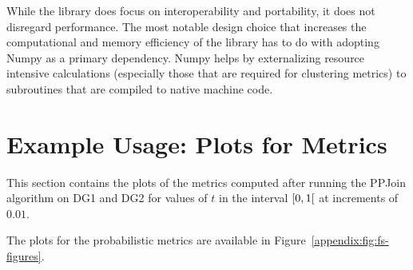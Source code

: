 \documentclass{article}
\begin{document}
    While the library does focus on interoperability and portability, it does
    not disregard performance.
    The most notable design choice that increases the computational and memory
    efficiency of the library has to do with adopting Numpy as a primary
    dependency.
    Numpy helps by externalizing resource intensive calculations (especially
    those that are required for clustering metrics) to subroutines that are
    compiled to native machine code.

    \section{Example Usage: Plots for Metrics}\label{appendix:sample-figures}
    This section contains the plots of the metrics computed after running the
    PPJoin algorithm on DG1 and DG2 for values of $t$ in the interval
    $\rinterval{0}{1}$ at increments of $0.01$.

    The plots for the probabilistic metrics are available in
    Figure~\ref{appendix:fig:fs-figures}.
\end{document}

